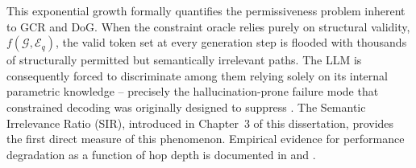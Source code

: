 This exponential growth formally quantifies the permissiveness problem inherent to GCR
and DoG. When the constraint oracle relies purely on structural validity, $f(\mathcal{G}, \mathcal{E}_q)$, the
valid token set at every generation step is flooded with thousands of structurally
permitted but semantically irrelevant paths. The LLM is consequently forced to discriminate among
them relying solely on its internal parametric knowledge -- precisely the hallucination-prone
failure mode that constrained decoding was originally designed to suppress
\citep{luo2024gcr, li2024dog}. The Semantic Irrelevance Ratio (SIR), introduced
in Chapter~3 of this dissertation, provides the first direct measure of this
phenomenon. Empirical evidence for performance degradation as a function of hop
depth is documented in \citet{he2021multihop} and \citet{lan2022survey}.

